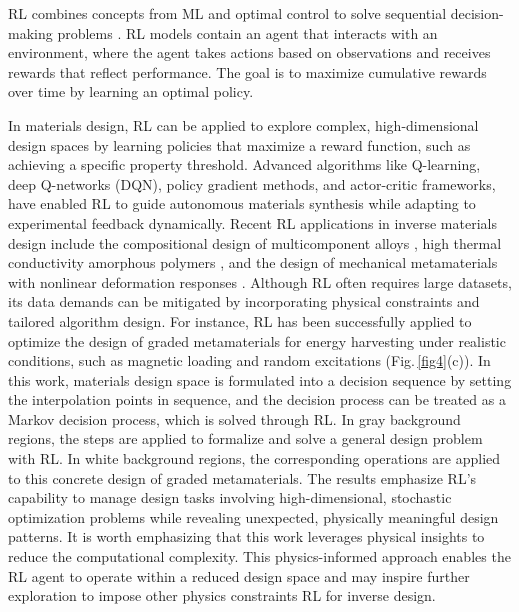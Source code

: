 \documentclass[fleqn,10pt]{wlscirep}
\begin{document}
RL combines concepts from ML and optimal control to solve sequential decision-making problems \cite{mnih2013playing,christiano2017deep}. RL models contain an agent that interacts with an environment, where the agent takes actions based on observations and receives rewards that reflect performance. The goal is to maximize cumulative rewards over time by learning an optimal policy. 

In materials design, RL can be applied to explore complex, high-dimensional design spaces by learning policies that maximize a reward function, such as achieving a specific property threshold. Advanced algorithms like Q-learning, deep Q-networks (DQN), policy gradient methods, and actor-critic frameworks, have enabled RL to guide autonomous materials synthesis while adapting to experimental feedback dynamically. 
Recent RL applications in inverse materials design include the compositional design of multicomponent alloys \cite{xian2024compositional}, high thermal conductivity amorphous polymers \cite{ma2022exploring}, and the design of mechanical metamaterials with nonlinear deformation responses \cite{brown2023deep}. Although RL often requires large datasets, its data demands can be mitigated by incorporating physical constraints and tailored algorithm design. For instance, RL has been successfully applied to optimize the design of graded metamaterials \cite{rosafalco2023reinforcement} for energy harvesting under realistic conditions, such as magnetic loading and random excitations (Fig.\,\ref{fig4}(c)). In this work,  materials design space is formulated into a decision sequence by setting the interpolation points in sequence, and the decision process can be treated as a Markov decision process, which is solved through RL. In gray background regions, the steps are applied to formalize and solve a general design problem with RL. In white background regions, the corresponding operations are applied to this concrete design of graded metamaterials. The results emphasize RL's capability to manage design tasks involving high-dimensional, stochastic optimization problems while revealing unexpected, physically meaningful design patterns. It is worth emphasizing that this work leverages physical insights to reduce the computational complexity. This physics-informed approach enables the RL agent to operate within a reduced design space and may inspire further exploration to impose other physics constraints RL for inverse design. 
\end{document}

